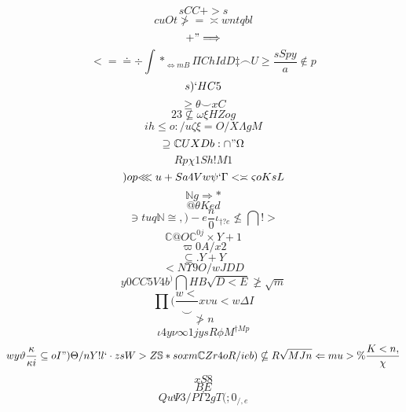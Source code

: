 \documentclass[12pt]{article}
\begin{document}
        \begin{minipage}[t][0pt]{\linewidth}

        \[sCC+>s\]
\[cuOt\ngtr =\asymp w n t q b l\]
\[+"\Longrightarrow\]
\[<=\doteq\div\int *_{\Leftrightarrow m B}\Pi C h I d D\ddagger\frown U\geq\frac{sSpy}{a}\notin p\]
\[s)`HC5\]
\[\geq\theta\smile x C\]
\[23\nsubseteq\omega\xi H Z o g\]
\[ih\leq o : / u\zeta\xi = O / X\Lambda g M\]
\[\supseteq\mathbb{C} U X D b :\cap " {\Omega}\]
\[Rp\chi 1 S h ! M 1\]
\[)op {\lll u + S a 4 V w}\psi `\Gamma <\asymp\varsigma o K s L\]
\[\mathbb{N} g\Longrightarrow *\]
\[@\theta K e d\]
\[\ni t u q\mathbb{N}\cong , ) - e\frac{n}{0}\iota_{\dagger ? e}\nleq\bigcap ! >\]
\[\mathbb{C} @ O\mathbb{C}^{0j}\times Y + 1\]
\[\varpi 0 A / x 2\]
\[\subseteq . Y + Y\]
\[<N\Upsilon 9 O / w J D D\]
\[y0CC5V4b^{)}\bigcap H B\sqrt{D<E}\ngeq\sqrt{m}\]
\[\prod (\frac{w<}{\smile} x\upsilon u < w\Delta I\]
\[\ngtr n\]
\[\iota 4 y\nu\infty 1 j y s R\phi M^{\dagger M p}\]
\[wy\vartheta\frac{\kappa}{\kappa i}\subseteq o I " )\Theta / n Y ! l `\cdot z s W > Z\mathbb{S} * s o x m\mathbb{C} Z r 4 o R / i e b )\nsubseteq R\sqrt{MJn}\Leftarrow m u >\%\frac{K<n,}{\chi}\]
\[xS8\]
\[BE\]
\[.\]
\[Qu\Psi 3 / P\Gamma 2 g T ( ; 0_{/, e}
        \]
\end{minipage}
\end{document}

